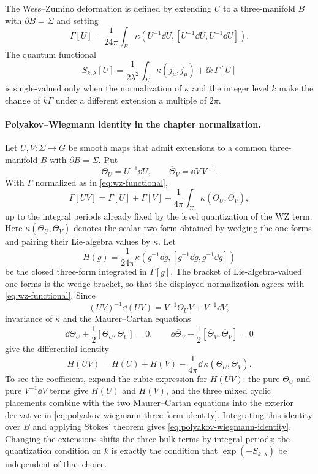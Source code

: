 The Wess--Zumino deformation is defined by extending \(U\) to a three-manifold
\(B\) with \(\partial B=\Sigma\) and setting
\begin{equation}
  \Gamma[U]
  =
  \frac1{24\pi}\int_B
  \kappa(U^{-1}\dd U,[U^{-1}\dd U,U^{-1}\dd U]).
  \label{eq:wz-functional}
\end{equation}
The quantum functional
\begin{equation}
  S_{k,\lambda}[U]
  =
  \frac1{2\lambda^2}\int_\Sigma\kappa(j_\mu,j_\mu)
  +\ii k\,\Gamma[U]
  \label{eq:pcm-wz-action}
\end{equation}
is single-valued only when the normalization of \(\kappa\) and the integer
level \(k\) make the change of \(k\Gamma\) under a different extension a
multiple of \(2\pi\).

\paragraph{Polyakov--Wiegmann identity in the chapter normalization.}
Let \(U,V:\Sigma\to G\) be smooth maps that admit extensions to a common
three-manifold \(B\) with \(\partial B=\Sigma\).  Put
\[
  \Theta_U=U^{-1}\dd U,\qquad
  \overline\Theta_V=\dd V\,V^{-1}.
\]
With \(\Gamma\) normalized as in \eqref{eq:wz-functional},
\begin{equation}
  \Gamma[UV]
  =
  \Gamma[U]+\Gamma[V]
  -\frac1{4\pi}\int_\Sigma \kappa(\Theta_U,\overline\Theta_V),
  \label{eq:polyakov-wiegmann-identity}
\end{equation}
up to the integral periods already fixed by the level quantization of the WZ
term.  Here \(\kappa(\Theta_U,\overline\Theta_V)\) denotes the scalar
two-form obtained by wedging the one-forms and pairing their Lie-algebra
values by \(\kappa\).
Let
\[
  H(g)
  =
  \frac1{24\pi}\kappa(g^{-1}\dd g,[g^{-1}\dd g,g^{-1}\dd g])
\]
be the closed three-form integrated in \(\Gamma[g]\).  The bracket of
Lie-algebra-valued one-forms is the wedge bracket, so that the displayed
normalization agrees with \eqref{eq:wz-functional}.  Since
\[
  (UV)^{-1}\dd(UV)
  =
  V^{-1}\Theta_UV+V^{-1}\dd V ,
\]
invariance of \(\kappa\) and the Maurer--Cartan equations
\[
  \dd\Theta_U+\frac12[\Theta_U,\Theta_U]=0,
  \qquad
  \dd\overline\Theta_V-\frac12[\overline\Theta_V,\overline\Theta_V]=0
\]
give the differential identity
\begin{equation}
  H(UV)
  =
  H(U)+H(V)
  -\frac1{4\pi}\dd\,\kappa(\Theta_U,\overline\Theta_V).
  \label{eq:polyakov-wiegmann-three-form-identity}
\end{equation}
To see the coefficient, expand the cubic expression for \(H(UV)\): the pure
\(\Theta_U\) and pure \(V^{-1}\dd V\) terms give \(H(U)\) and \(H(V)\), and
the three mixed cyclic placements combine with the two Maurer--Cartan
equations into the exterior derivative in
\eqref{eq:polyakov-wiegmann-three-form-identity}.  Integrating this identity
over \(B\) and applying Stokes' theorem gives
\eqref{eq:polyakov-wiegmann-identity}.  Changing the extensions shifts the
three bulk terms by integral periods; the quantization condition on \(k\) is
exactly the condition that \(\exp(-S_{k,\lambda})\) be independent of that
choice.

